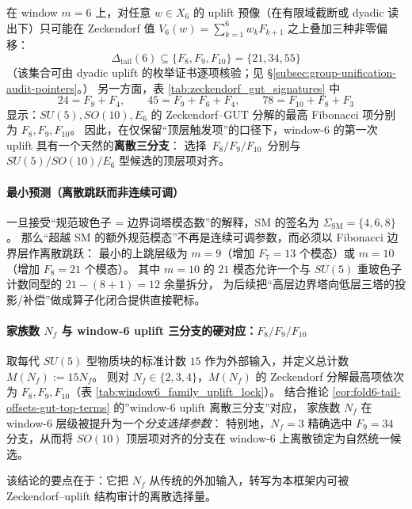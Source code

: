 \begin{corollary}\label{cor:fold6-tail-offsets-gut-top-terms}
在 window \(m=6\) 上，对任意 \(w\in X_6\) 的 uplift 预像（在有限域截断或 dyadic 读出下）只可能在 Zeckendorf 值
\(
V_6(w)=\sum_{k=1}^{6}w_kF_{k+1}
\)
之上叠加三种非零偏移：
\[
\Delta_{\mathrm{tail}}(6)\subseteq \{F_8,F_9,F_{10}\}=\{21,34,55\}
\]
（该集合可由 dyadic uplift 的枚举证书逐项核验；见 \S\ref{subsec:group-unification-audit-pointers}。）
另一方面，表 \ref{tab:zeckendorf_gut_signatures} 中
\[
24=F_8+F_4,\qquad 45=F_9+F_6+F_4,\qquad 78=F_{10}+F_8+F_3
\]
显示：\(SU(5),SO(10),E_6\) 的 Zeckendorf--GUT 分解的最高 Fibonacci 项分别为 \(F_8,F_9,F_{10}\)。
因此，在仅保留“顶层触发项”的口径下，window-\(6\) 的第一次 uplift 具有一个天然的\textbf{离散三分支}：
选择 \(\,F_8/F_9/F_{10}\,\) 分别与 \(SU(5)/SO(10)/E_6\) 型候选的顶层项对齐。
\end{corollary}

\paragraph{最小预测（离散跳跃而非连续可调）}
一旦接受“规范玻色子 = 边界词塔模态数”的解释，SM 的签名为
\(\Sigma_{\mathrm{SM}}=\{4,6,8\}\)。
那么“超越 SM 的额外规范模态”不再是连续可调参数，而必须以 Fibonacci 边界层作离散跳跃：
最小的上跳层级为 \(m=9\)（增加 \(F_7=13\) 个模态）或 \(m=10\)（增加 \(F_8=21\) 个模态）。
其中 \(m=10\) 的 \(21\) 模态允许一个与 \(SU(5)\) 重玻色子计数同型的 \(21-(8+1)=12\) 余量拆分，
为后续把“高层边界塔向低层三塔的投影/补偿”做成算子化闭合提供直接靶标。

\paragraph{家族数 \(N_f\) 与 window-6 uplift 三分支的硬对应：\(F_8/F_9/F_{10}\)}
取每代 \(SU(5)\) 型物质块的标准计数 \(15\) 作为外部输入，并定义总计数
\(
M(N_f):=15N_f
\)。
则对 \(N_f\in\{2,3,4\}\)，\(M(N_f)\) 的 Zeckendorf 分解最高项依次为 \(F_8,F_9,F_{10}\)（表 \ref{tab:window6_family_uplift_lock}）。
结合推论 \ref{cor:fold6-tail-offsets-gut-top-terms} 的”window-6 uplift 离散三分支”对应，
家族数 \(N_f\) 在 window-6 层级被提升为一个\emph{分支选择参数}：
特别地，\(N_f=3\) 精确选中 \(F_9=34\) 分支，从而将 \(SO(10)\) 顶层项对齐的分支在 window-6 上离散锁定为自然统一候选。

\par
该结论的要点在于：它把 \(N_f\) 从传统的外加输入，转写为本框架内可被 Zeckendorf--uplift 结构审计的离散选择量。

